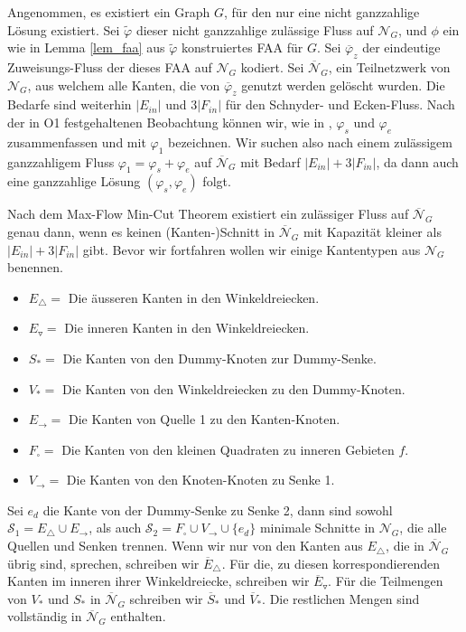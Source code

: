 Angenommen, es existiert ein Graph $G$, für den nur eine nicht ganzzahlige Lösung existiert. Sei $\tilde{\varphi}$ dieser nicht ganzzahlige zulässige Fluss auf $\mathcal{N}_G$, und $\phi$ ein wie in Lemma \ref{lem_faa} aus $\tilde{\varphi}$ konstruiertes FAA für $G$. Sei $\overline{\varphi}_z$ der eindeutige Zuweisungs-Fluss der dieses FAA auf $\mathcal{N}_G$ kodiert. Sei $\overline{\mathcal{N}}_G$, ein Teilnetzwerk von $\mathcal{N}_G$, aus welchem alle Kanten, die von $\overline{\varphi}_z$ genutzt werden gelöscht wurden. Die Bedarfe sind weiterhin $|E_{in}|$ und $3|F_{in}|$ für den Schnyder- und Ecken-Fluss. Nach der in O1 festgehaltenen Beobachtung können wir, wie in \cite{af15}, $\varphi_s$ und $\varphi_e$ zusammenfassen und mit $\varphi_1$ bezeichnen. Wir suchen also nach einem zulässigem ganzzahligem Fluss $\varphi_1 = \varphi_s + \varphi_e$ auf $\overline{\mathcal{N}}_G$ mit Bedarf $|E_{in}| + 3|F_{in}|$, da dann auch eine ganzzahlige Lösung $(\varphi_s,\varphi_e)$ folgt.

Nach dem Max-Flow Min-Cut Theorem existiert ein zulässiger Fluss auf $\overline{\mathcal{N}}_G$ genau dann, wenn es keinen (Kanten-)Schnitt in $\overline{\mathcal{N}}_G$ mit Kapazität kleiner als $|E_{in}| + 3|F_{in}|$ gibt. Bevor wir fortfahren wollen wir einige Kantentypen aus $\mathcal{N}_G$ benennen.

\begin{itemize}
\item $E_\triangle = $ Die äusseren Kanten in den Winkeldreiecken.
\item $E_\triangledown = $ Die inneren Kanten in den Winkeldreiecken.
\item $S_* =$ Die Kanten von den Dummy-Knoten zur Dummy-Senke.
\item $V_* = $ Die Kanten von den Winkeldreiecken zu den Dummy-Knoten.
\item $E_{\to} = $ Die Kanten von Quelle 1 zu den Kanten-Knoten.
\item $F_\square = $ Die Kanten von den kleinen Quadraten zu inneren Gebieten $f$.
\item $V_{\to} = $ Die Kanten von den Knoten-Knoten zu Senke 1.
\end{itemize}

Sei $e_{d}$ die Kante von der Dummy-Senke zu Senke 2, dann sind sowohl $\mathcal{S}_1 = E_\triangle \cup E_{\to}$, als auch $\mathcal{S}_2 = F_\square \cup V_{\to} \cup \{e_{d}\}$ minimale Schnitte in $\mathcal{N}_G$, die alle Quellen und Senken trennen. Wenn wir nur von den Kanten aus $E_\triangle$, die in $\overline{\mathcal{N}}_G$ übrig sind, sprechen, schreiben wir $\overline{E}_\triangle$. Für die, zu diesen korrespondierenden Kanten im inneren ihrer Winkeldreiecke, schreiben wir $\overline{E}_\triangledown$. Für die Teilmengen von $V_*$ und $S_*$ in $\overline{\mathcal{N}}_G$ schreiben wir $\overline{S}_*$ und $\overline{V}_*$. Die restlichen Mengen sind vollständig in $\overline{\mathcal{N}}_G$ enthalten.

